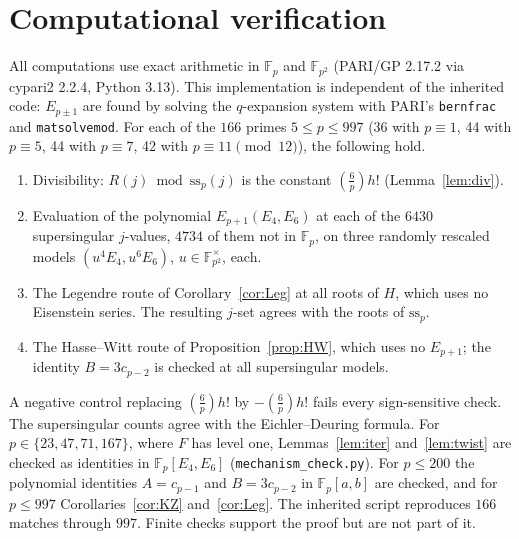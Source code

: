 \documentclass[11pt,a4paper]{article}
\numberwithin{equation}{section}
\theoremstyle{definition}
\theoremstyle{remark}
\newcommand{\Fp}{\mathbb F_p}
\newcommand{\Fq}{\mathbb F_{p^2}}
\newcommand{\Lp}[1]{\left(\frac{#1}{p}\right)}
\begin{document}
\section{Computational verification}\label{sec:comp}
All computations use exact arithmetic in $\Fp$ and $\Fq$ (PARI/GP 2.17.2 via cypari2 2.2.4,
Python 3.13). This implementation is independent of the inherited code: $E_{p\pm1}$ are found
by solving the $q$-expansion system with PARI's \texttt{bernfrac} and \texttt{matsolvemod}.
For each of the $166$ primes $5\le p\le997$ (36 with $p\equiv1$, 44 with $p\equiv5$, 44 with
$p\equiv7$, 42 with $p\equiv11\pmod{12}$), the following hold.
\begin{enumerate}[label=\textup{(\Roman*)}]
\item[(IV)] Divisibility: $R(j)\bmod\mathrm{ss}_p(j)$ is the constant $\Lp6h!$
(Lemma~\ref{lem:div}).
\item[(I)] Evaluation of the polynomial $E_{p+1}(E_4,E_6)$ at each of the $6430$
supersingular $j$-values, $4734$ of them not in $\Fp$, on three randomly rescaled models
$(u^4E_4,u^6E_6)$, $u\in\Fq^\times$, each.
\item[(II)] The Legendre route of Corollary~\ref{cor:Leg} at all roots of $H$, which uses no
Eisenstein series. The resulting $j$-set agrees with the roots of $\mathrm{ss}_p$.
\item[(III)] The Hasse--Witt route of Proposition~\ref{prop:HW}, which uses no $E_{p+1}$; the
identity $B=3c_{p-2}$ is checked at all supersingular models.
\end{enumerate}
A negative control replacing $\Lp6h!$ by $-\Lp6h!$ fails every sign-sensitive check. The
supersingular counts agree with the Eichler--Deuring formula. For
$p\in\{23,47,71,167\}$, where $F$ has level one, Lemmas~\ref{lem:iter} and~\ref{lem:twist}
are checked as identities in $\Fp[E_4,E_6]$ (\texttt{mechanism\_check.py}). For $p\le200$
the polynomial identities $A=c_{p-1}$ and $B=3c_{p-2}$ in $\Fp[a,b]$ are checked, and for
$p\le997$ Corollaries~\ref{cor:KZ} and~\ref{cor:Leg}. The inherited script reproduces
$166$ matches through $997$. Finite checks support the proof but are not part of it.
\end{document}
